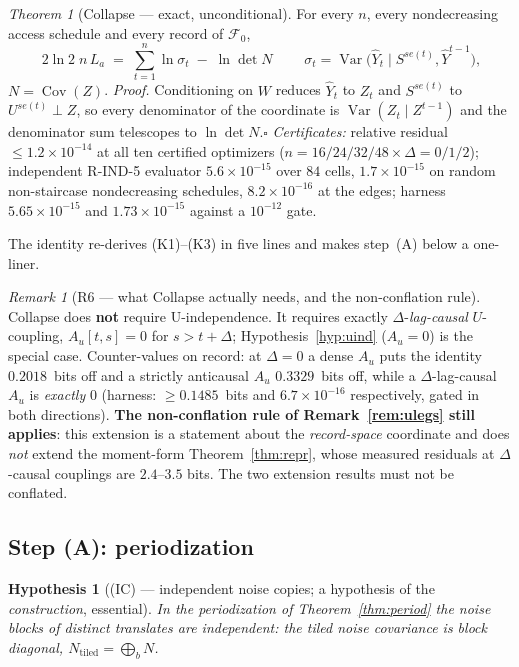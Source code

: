 \documentclass[11pt]{article}
\newtheorem{hypothesis}{Hypothesis}
\theoremstyle{definition}
\theoremstyle{remark}
\newtheorem{remark}{Remark}
\newtheorem{namedthm}{Theorem}
\begin{document}
\begin{namedthm}[Collapse --- exact, unconditional]
\label{thm:collapse}
For every $n$, every nondecreasing access schedule and every record of
$\mathcal F_0$,
\[
\boxed{\;2\ln2\;n\,L_a\;=\;\sum_{t=1}^n\ln\sigma_t\;-\;\ln\det N\;}
\qquad
\sigma_t=\operatorname{Var}\bigl(\hat Y_t\mid S^{se(t)},\hat
Y^{t-1}\bigr),
\]
$N=\operatorname{Cov}(Z)$. \emph{Proof.} Conditioning on $W$ reduces
$\hat Y_t$ to $Z_t$ and $S^{se(t)}$ to $U^{se(t)}\perp Z$, so every
denominator of the coordinate is $\operatorname{Var}(Z_t\mid Z^{t-1})$
and the denominator sum telescopes to $\ln\det N$.\hfill$\square$
\emph{Certificates:} relative residual $\le1.2\times10^{-14}$ at all
ten certified optimizers ($n=16/24/32/48\times\Delta=0/1/2$);
independent R-IND-5 evaluator $5.6\times10^{-15}$ over $84$ cells,
$1.7\times10^{-15}$ on random non-staircase nondecreasing schedules,
$8.2\times10^{-16}$ at the edges; harness $5.65\times10^{-15}$ and
$1.73\times10^{-15}$ against a $10^{-12}$ gate.
\end{namedthm}

\noindent The identity re-derives (K1)--(K3) in five lines and makes
step~(A) below a one-liner.

\begin{remark}[R6 --- what Collapse actually needs, and the
non-conflation rule]
\label{rem:R6}
Collapse does \textbf{not} require U-independence. It requires exactly
$\Delta$-\emph{lag-causal} $U$-coupling, $A_u[t,s]=0$ for $s>t+\Delta$;
Hypothesis~\ref{hyp:uind} ($A_u=0$) is the special case. Counter-values
on record: at $\Delta=0$ a dense $A_u$ puts the identity
$0.2018$~bits off and a strictly anticausal $A_u$ $0.3329$~bits off,
while a $\Delta$-lag-causal $A_u$ is \emph{exactly} $0$ (harness:
$\ge0.1485$~bits and $6.7\times10^{-16}$ respectively, gated in both
directions). \textbf{The non-conflation rule of
Remark~\ref{rem:ulegs} still applies}: this extension is a statement
about the \emph{record-space} coordinate and does \emph{not} extend the
moment-form Theorem~\ref{thm:repr}, whose measured residuals at
$\Delta$-causal couplings are $2.4$--$3.5$ bits. The two extension
results must not be conflated.
\end{remark}

\subsection{Step (A): periodization}

\begin{hypothesis}[(IC) --- independent noise copies; a hypothesis of
the \emph{construction}, essential]
\label{hyp:indcopies}
In the periodization of Theorem~\ref{thm:period} the noise blocks of
distinct translates are \emph{independent}: the tiled noise covariance
is block diagonal, $N_{\mathrm{tiled}}=\bigoplus_{b}N$.
\end{hypothesis}
\end{document}
